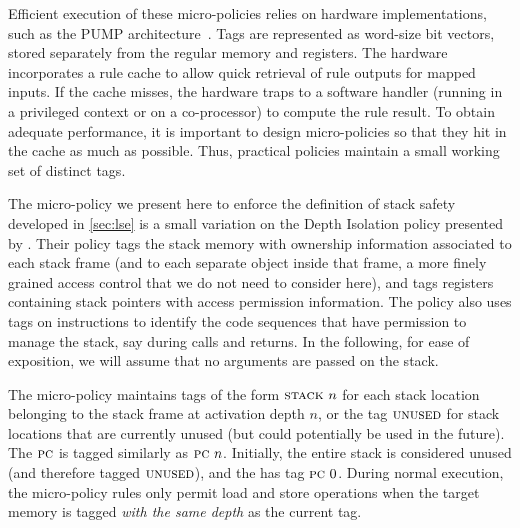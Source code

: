 \documentclass[acmsmall,review,anonymous]{acmart}\settopmatter{printfolios=true,printccs=false,printacmref=false}
\begin{document}
Efficient execution of these micro-policies relies on hardware implementations,
such as the PUMP architecture~\citep{pump:asplos2015}.  Tags are represented
as word-size bit vectors, stored separately from the regular memory and registers.
The hardware incorporates a rule cache
to allow quick retrieval of rule outputs for mapped inputs. If the cache misses,
the hardware traps to a software handler (running in a privileged context or
on a co-processor) to compute the rule result. To obtain adequate performance,
it is important to design micro-policies so that they hit in the cache as
much as possible. Thus, practical policies maintain a small working set of
distinct tags.


The micro-policy we present here to enforce the definition of stack
safety developed in \cref{sec:lse} is a small variation
on the Depth Isolation policy presented by
\citet{DBLP:conf/sp/RoesslerD18}. Their policy tags the stack memory
with ownership information associated to each stack frame (and to each
separate object inside that frame, a more finely grained access
control that we do not need to consider here), and tags registers containing
stack pointers with access permission information. The policy also
uses tags on instructions to identify the code
sequences that have permission to manage the stack, say during calls and returns.
In the following, for ease of exposition, we will assume that no
arguments are passed on the stack.

The micro-policy maintains tags of the form $\textsc{stack} ~ n$ for
each stack location belonging to the stack frame at activation depth
$n$, or the tag $\textsc{unused}$ for stack locations that are currently
unused (but could potentially be used in the future).
%
The $\textsc{pc}$ is tagged similarly as $\textsc{pc} ~ n$.
%
Initially, the entire stack is considered unused (and therefore tagged
$\textsc{unused}$), and the {\PCname} has tag $\textsc{pc} ~ 0$.
%
During normal execution, the micro-policy rules only permit load and
store operations when the target memory is tagged {\em with the same
  depth} as the current {\PCname} tag.
\end{document}
